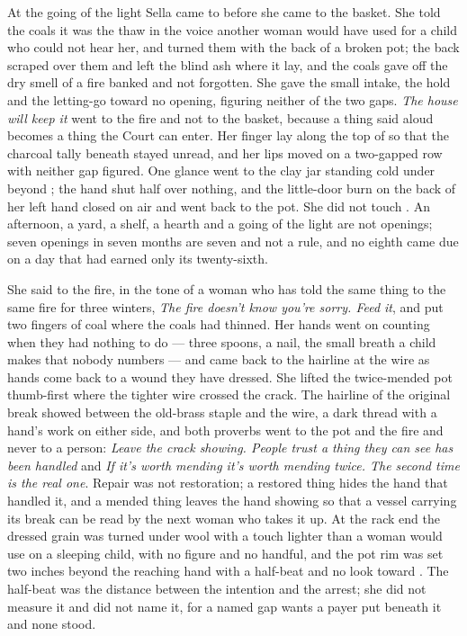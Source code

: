 \scenebreak

At the going of the light Sella came to  before she came to the basket. She told the coals it was the thaw in the voice another woman would have used for a child who could not hear her, and turned them with the back of a broken pot; the back scraped over them and left the blind ash where it lay, and the coals gave off the dry smell of a fire banked and not forgotten. She gave the small intake, the hold and the letting-go toward no opening, figuring neither of the two gaps. \emph{The house will keep it} went to the fire and not to the basket, because a thing said aloud becomes a thing the Court can enter. Her finger lay along the top of  so that the charcoal tally beneath stayed unread, and her lips moved on a two-gapped row with neither gap figured. One glance went to the clay jar standing cold under  beyond ; the hand shut half over nothing, and the little-door burn on the back of her left hand closed on air and went back to the pot. She did not touch . An afternoon, a yard, a shelf, a hearth and a going of the light are not openings; seven openings in seven months are seven and not a rule, and no eighth came due on a day that had earned only its twenty-sixth.

She said to the fire, in the tone of a woman who has told the same thing to the same fire for three winters, \emph{The fire doesn't know you're sorry. Feed it}, and put two fingers of coal where the coals had thinned. Her hands went on counting when they had nothing to do --- three spoons, a nail, the small breath a child makes that nobody numbers --- and came back to the hairline at the wire as hands come back to a wound they have dressed. She lifted the twice-mended pot thumb-first where the tighter wire crossed the crack. The hairline of the original break showed between the old-brass staple and the wire, a dark thread with a hand's work on either side, and both proverbs went to the pot and the fire and never to a person: \emph{Leave the crack showing. People trust a thing they can see has been handled} and \emph{If it's worth mending it's worth mending twice. The second time is the real one}. Repair was not restoration; a restored thing hides the hand that handled it, and a mended thing leaves the hand showing so that a vessel carrying its break can be read by the next woman who takes it up. At the rack end the dressed grain was turned under wool with a touch lighter than a woman would use on a sleeping child, with no figure and no handful, and the pot rim was set two inches beyond the reaching hand with a half-beat and no look toward . The half-beat was the distance between the intention and the arrest; she did not measure it and did not name it, for a named gap wants a payer put beneath it and none stood.

